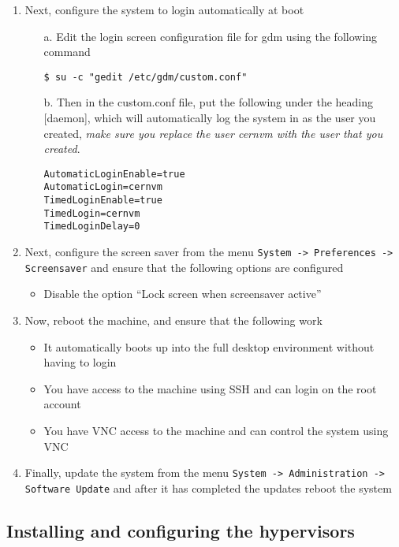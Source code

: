 \begin{enumerate}
\item	Next, configure the system to login automatically at boot
\begin{itemize}
\item[a.]	Edit the login screen configuration file for gdm using the following command
\begin{lstlisting}
$ su -c "gedit /etc/gdm/custom.conf"
\end{lstlisting}

\item[b.]	Then in the custom.conf file, put the following under the heading [daemon], which will automatically
			log the system in as the user you created, \emph{make sure you replace the user cernvm with the user
			that you created}.
\lstset{caption=Configure Automatic Login}
\begin{lstlisting}
AutomaticLoginEnable=true
AutomaticLogin=cernvm
TimedLoginEnable=true
TimedLogin=cernvm
TimedLoginDelay=0
\end{lstlisting}		
\end{itemize}

\item	Next, configure the screen saver from the menu \verb|System -> Preferences -> Screensaver| and ensure that
		the following options are configured
\begin{itemize}
\item	Disable the option ``Lock screen when screensaver active''
\end{itemize}

\item	Now, reboot the machine, and ensure that the following work
\begin{itemize}
\item	It automatically boots up into the full desktop environment without having to login
\item	You have access to the machine using SSH and can login on the root account
\item	You have VNC access to the machine and can control the system using VNC	
\end{itemize}

\item	Finally, update the system from the menu \verb|System -> Administration -> Software Update| and after it has 
		completed the updates reboot the system
\end{enumerate}

\subsection{Installing and configuring the hypervisors}
